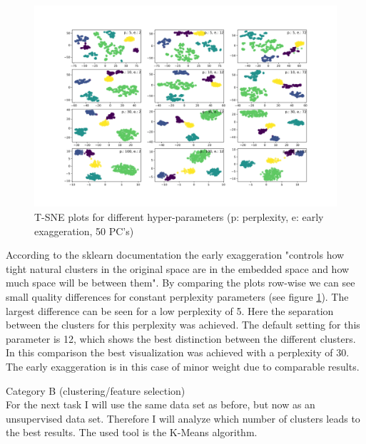 \begin{figure}[h]
	\centering
	\includegraphics[width=1.0\linewidth, trim={4cm 2cm 3.5cm 2cm}]{problem_03/TSNE_hyper_parameter}
	\caption{T-SNE plots for different hyper-parameters (p: perplexity, e: early exaggeration, 50 PC's)}
	\label{fig:TSNE_hyper_parameter}
\end{figure}

According to the sklearn documentation the early exaggeration "controls how tight natural clusters in the original space are in the embedded space and how much space will be between them". By comparing the plots row-wise we can see small quality differences for constant perplexity parameters (see figure \ref{fig:TSNE_hyper_parameter}). The largest difference can be seen for a low perplexity of 5. Here the separation between the clusters for this perplexity was achieved. The default setting for this parameter is 12, which shows the best distinction between the different clusters.\\

In this comparison the best visualization was achieved with a perplexity of 30. The early exaggeration is in this case of minor weight due to comparable results.\\

\vspace{2cm}

Category B (clustering/feature selection)\\
For the next task I will use the same data set as before, but now as an unsupervised data set. Therefore I will analyze which number of clusters leads to the best results. The used tool is the K-Means algorithm.\\

